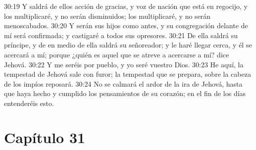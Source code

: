 30:19 Y saldrá de ellos acción de gracias, y voz de nación que está en regocijo, y los multiplicaré, y no serán disminuidos; los multiplicaré, y no serán menoscabados. 
30:20 Y serán sus hijos como antes, y su congregación delante de mí será confirmada; y castigaré a todos sus opresores. 
30:21 De ella saldrá su príncipe, y de en medio de ella saldrá su señoreador; y le haré llegar cerca, y él se acercará a mí; porque ¿quién es aquel que se atreve a acercarse a mí? dice Jehová. 
30:22 Y me seréis por pueblo, y yo seré vuestro Dios. 
30:23 He aquí, la tempestad de Jehová sale con furor; la tempestad que se prepara, sobre la cabeza de los impíos reposará. 
30:24 No se calmará el ardor de la ira de Jehová, hasta que haya hecho y cumplido los pensamientos de su corazón; en el fin de los días entenderéis esto. 
\section*{Capítulo 31 }
 
